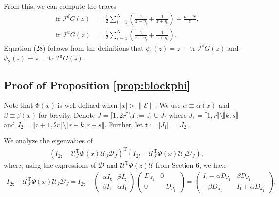 \documentclass[reqno]{amsart}
\DeclareMathOperator{\tr}{tr}
\newcommand{\T}{\mathrm{T}}
\theoremstyle{plain}
\theoremstyle{definition}
\begin{document}
From this, we can compute the traces
\begin{align*}
\tr\mathcal{I}^d G(z) &= \frac{1}{2} \sum_{i=1}^N \left(\frac{1}{z-\eta_i} + \frac{1}{z+\eta_i}\right) + \frac{n-N}{z},\\
\tr\mathcal{I}^u G(z) &= \frac{1}{2} \sum_{i=1}^N \left(\frac{1}{z-\eta_i} + \frac{1}{z+\eta_i}\right).
\end{align*}
Equation (28) follows from the definitions that $\phi_1(z) = z - \tr \mathcal{I}^\mathrm{d} G(z)$ and $\phi_2(z) = z- \tr \mathcal{I}^\mathrm{u} G(z)$.

\subsection{Proof of Proposition \ref{prop:blockphi}}\label{app:svaluecompute}
Note that $\Phi(x)$ is well-defined when $|x|>\|\mathcal E\|$.  We use $\alpha\equiv\alpha(x)$ and $\beta \equiv \beta(x)$ for brevity. Denote $J=\llbracket 1,2r\rrbracket\setminus I :=J_1 \cup J_2$ where $J_1= \llbracket 1,r\rrbracket\setminus\llbracket k,s\rrbracket$ and $J_2= \llbracket r+1,2r\rrbracket\setminus\llbracket r+k,r+s\rrbracket$. Further, let $\mathsf t:=|J_1| =|J_2|.$

We analyze the eigenvalues of 
\begin{align}\label{eq:positivematrix}
\left( I_{2\mathsf t} - \mathcal U_J^\T \Phi(x) \mathcal U_J \mathcal D_J \right)^\T \left( I_{2l} - \mathcal U_J^\T \Phi(x) \mathcal U_J \mathcal D_J \right),
\end{align}
where, using the expressions of $\mathcal D$ and  $\mathcal U^\T \Phi(z) \mathcal U$ from Section 6, we have
\begin{align*}
I_{2\mathsf t} - \mathcal U_J^\T \Phi(x) \mathcal U_J \mathcal D_J = I_{2\mathsf t}- \begin{pmatrix} \alpha I_{\mathsf t} & \beta I_{\mathsf t}\\
\beta I_{\mathsf t} & \alpha I_{\mathsf t} 
\end{pmatrix}
\begin{pmatrix} D_{J_1} &0\\
0 & -D_{J_1}
\end{pmatrix}=
\begin{pmatrix} I_{\mathsf t}- \alpha D_{J_1} & \beta D_{J_1}\\
-\beta D_{J_1} & I_{\mathsf t}+ \alpha D_{J_1}
\end{pmatrix}.
\end{align*}
\end{document}
